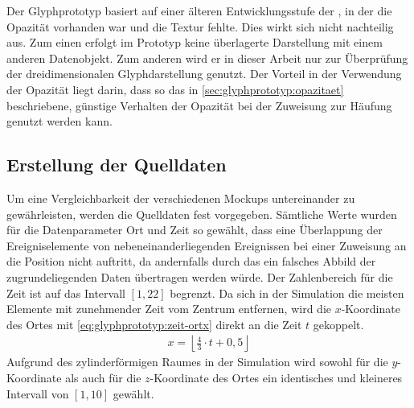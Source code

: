 
Der Glyphprototyp basiert auf einer älteren Entwicklungsstufe der , in der die Opazität vorhanden war und die Textur fehlte. Dies wirkt sich nicht nachteilig aus. Zum einen erfolgt im Prototyp keine überlagerte Darstellung mit einem anderen Datenobjekt. Zum anderen wird er in dieser Arbeit nur zur Überprüfung der dreidimensionalen Glyphdarstellung genutzt. Der Vorteil in der Verwendung der Opazität liegt darin, dass so das in \autoref{sec:glyphprototyp:opazitaet} beschriebene, günstige Verhalten der Opazität bei der Zuweisung zur Häufung genutzt werden kann.

\subsection*{Erstellung der Quelldaten}\label{sec:glyphprototyp:daten}
Um eine Vergleichbarkeit der verschiedenen Mockups untereinander zu gewährleisten, werden die Quelldaten fest vorgegeben. Sämtliche Werte wurden für die Datenparameter Ort und Zeit so gewählt, dass eine Überlappung der Ereigniselemente von nebeneinanderliegenden Ereignissen bei einer Zuweisung an die  Position nicht auftritt, da andernfalls durch das  ein falsches Abbild der zugrundeliegenden Daten übertragen werden würde. Der Zahlenbereich für die Zeit ist auf das Intervall $[1,22]$ begrenzt. Da sich in der Simulation die meisten Elemente mit zunehmender Zeit vom Zentrum entfernen, wird die $x$-Koordinate des Ortes mit \autoref{eq:glyphprototyp:zeit-ortx} direkt an die Zeit $t$ gekoppelt.
\begin{align}\label{eq:glyphprototyp:zeit-ortx}
	x = \left\lfloor\frac 43\cdot t + 0,5\right\rfloor
\end{align}
Aufgrund des zylinderförmigen Raumes in der Simulation wird sowohl für die $y$-Koordinate als auch für die $z$-Koordinate des Ortes ein identisches und kleineres Intervall von $[1,10]$ gewählt.

